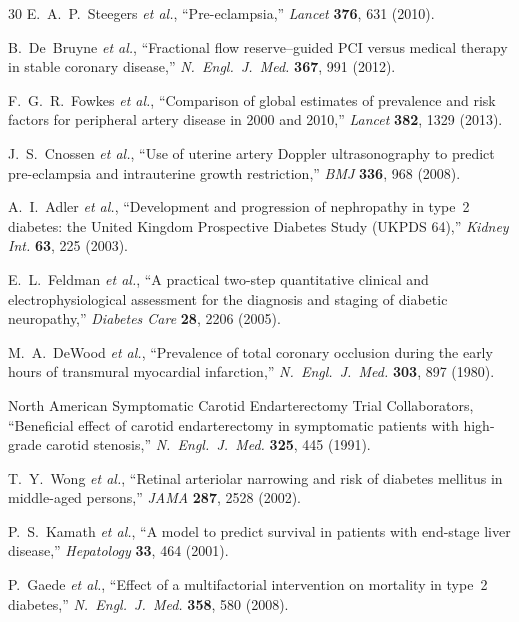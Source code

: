 ﻿\documentclass[aps,pre,twocolumn,superscriptaddress,floatfix]{revtex4-2}
\begin{document}
\begin{thebibliography}{30}
E.~A.~P.~Steegers \emph{et al.},
``Pre-eclampsia,''
\emph{Lancet} \textbf{376}, 631 (2010).

B.~De~Bruyne \emph{et al.},
``Fractional flow reserve--guided PCI versus medical therapy
  in stable coronary disease,''
\emph{N.\ Engl.\ J.\ Med.} \textbf{367}, 991 (2012).

F.~G.~R.~Fowkes \emph{et al.},
``Comparison of global estimates of prevalence and risk
  factors for peripheral artery disease in 2000 and 2010,''
\emph{Lancet} \textbf{382}, 1329 (2013).

J.~S.~Cnossen \emph{et al.},
``Use of uterine artery Doppler ultrasonography to predict
  pre-eclampsia and intrauterine growth restriction,''
\emph{BMJ} \textbf{336}, 968 (2008).

A.~I.~Adler \emph{et al.},
``Development and progression of nephropathy in type~2
  diabetes: the United Kingdom Prospective Diabetes Study
  (UKPDS 64),''
\emph{Kidney Int.} \textbf{63}, 225 (2003).

E.~L.~Feldman \emph{et al.},
``A practical two-step quantitative clinical and
  electrophysiological assessment for the diagnosis and
  staging of diabetic neuropathy,''
\emph{Diabetes Care} \textbf{28}, 2206 (2005).

M.~A.~DeWood \emph{et al.},
``Prevalence of total coronary occlusion during the early
  hours of transmural myocardial infarction,''
\emph{N.\ Engl.\ J.\ Med.} \textbf{303}, 897 (1980).

North American Symptomatic Carotid Endarterectomy Trial
  Collaborators,
``Beneficial effect of carotid endarterectomy in symptomatic
  patients with high-grade carotid stenosis,''
\emph{N.\ Engl.\ J.\ Med.} \textbf{325}, 445 (1991).

T.~Y.~Wong \emph{et al.},
``Retinal arteriolar narrowing and risk of diabetes
  mellitus in middle-aged persons,''
\emph{JAMA} \textbf{287}, 2528 (2002).

P.~S.~Kamath \emph{et al.},
``A model to predict survival in patients with end-stage
  liver disease,''
\emph{Hepatology} \textbf{33}, 464 (2001).

P.~Gaede \emph{et al.},
``Effect of a multifactorial intervention on mortality in
  type~2 diabetes,''
\emph{N.\ Engl.\ J.\ Med.} \textbf{358}, 580 (2008).


\end{thebibliography}
\end{document}
